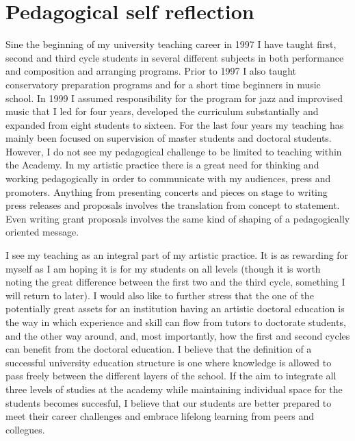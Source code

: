 \documentclass[a4paper]{article}
\begin{document}

\section*{\textsf{Pedagogical self reflection}}

Sine the beginning of my university teaching career in 1997 I have taught first, second and third cycle students in several different subjects in both performance and composition and arranging programs. Prior to 1997 I also taught conservatory preparation programs and for a short time beginners in music school. In 1999 I assumed responsibility for the program for jazz and improvised music that I led for four years, developed the curriculum substantially and expanded from eight students to sixteen. For the last four years my teaching has mainly been focused on supervision of master students and doctoral students. However, I do not see my pedagogical challenge to be limited to teaching within the Academy. In my artistic practice there is a great need for thinking and working pedagogically in order to communicate with my audiences, press and promoters. Anything from presenting concerts and pieces on stage to writing press releases and proposals involves the translation from concept to statement. Even writing grant proposals involves the same kind of shaping of a pedagogically oriented message.

I see my teaching as an integral part of my artistic practice. It is as rewarding for myself as I am hoping it is for my students on all levels (though it is worth noting the great difference between the first two and the third cycle, something I will return to later). I would also like to further stress that the one of the potentially great assets for an institution having an artistic doctoral education is the way in which experience and skill can flow from tutors to doctorate students, and the other way around, and, most importantly, how the first and second cycles can benefit from the doctoral education. I believe that the definition of a successful university education structure is one where knowledge is allowed to pass freely between the different layers of the school. If the aim to integrate all three levels of studies at the academy while maintaining individual space for the students becomes succesful, I believe that our students are better prepared to meet their career challenges and embrace lifelong learning from peers and collegues.
\end{document}
